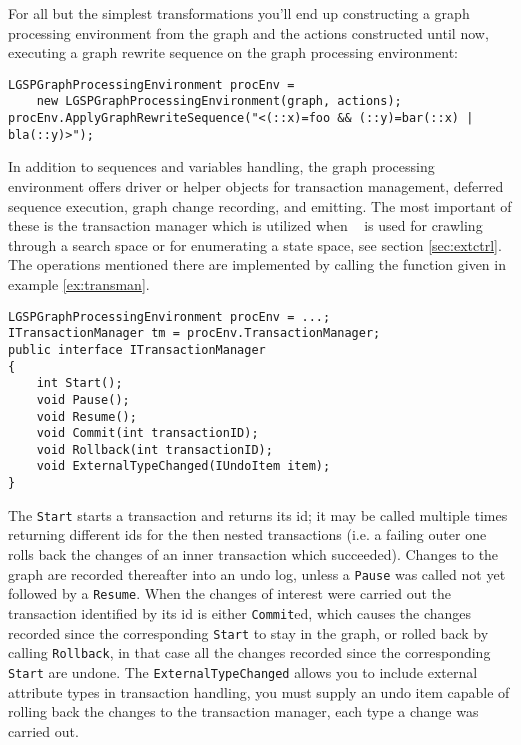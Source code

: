 \begin{example}\label{ex:procenv}
For all but the simplest transformations you'll end up constructing a graph processing environment from the graph and the actions constructed until now, executing a graph rewrite sequence on the graph processing environment:
\begin{verbatim}
LGSPGraphProcessingEnvironment procEnv = 
    new LGSPGraphProcessingEnvironment(graph, actions);
procEnv.ApplyGraphRewriteSequence("<(::x)=foo && (::y)=bar(::x) | bla(::y)>");
\end{verbatim}
\end{example}

In addition to sequences and variables handling, the graph processing environment offers driver or helper objects for transaction management, deferred sequence execution, graph change recording, and emitting.
The most important of these is the transaction manager which is utilized when \GrG~ is used for crawling through a search space or for enumerating a state space, see section \ref{sec:extctrl}.
The operations mentioned there are implemented by calling the function given in example \ref{ex:transman}.

\begin{example}\label{ex:transman}
\begin{verbatim}
LGSPGraphProcessingEnvironment procEnv = ...;
ITransactionManager tm = procEnv.TransactionManager;
public interface ITransactionManager
{
    int Start();
    void Pause();
    void Resume();
    void Commit(int transactionID);
    void Rollback(int transactionID);
    void ExternalTypeChanged(IUndoItem item);
}
\end{verbatim}
\end{example}

The \texttt{Start} starts a transaction and returns its id; it may be called multiple times returning different ids for the then nested transactions (i.e. a failing outer one rolls back the changes of an inner transaction which succeeded).
Changes to the graph are recorded thereafter into an undo log, unless a \texttt{Pause} was called not yet followed by a \texttt{Resume}.
When the changes of interest were carried out the transaction identified by its id is either \texttt{Commit}ed, which causes the changes recorded since the corresponding \texttt{Start} to stay in the graph, or rolled back by calling \texttt{Rollback}, in that case all the changes recorded since the corresponding \texttt{Start} are undone.
The \texttt{ExternalTypeChanged} allows you to include external attribute types in transaction handling, you must supply an undo item capable of rolling back the changes to the transaction manager, each type a change was carried out.

